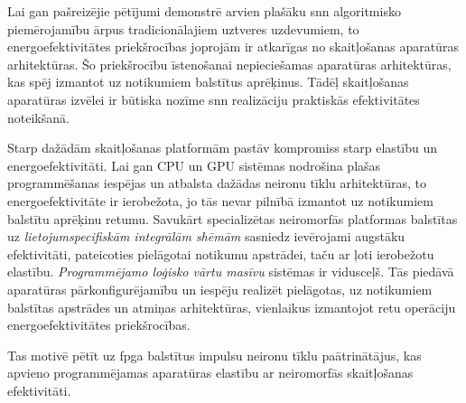 
Lai gan pašreizējie pētījumi demonstrē arvien plašāku \Gls{snn} algoritmisko piemērojamību ārpus tradicionālajiem uztveres
uzdevumiem, to energoefektivitātes priekšrocības joprojām ir atkarīgas no skaitļošanas aparatūras arhitektūras. Šo
priekšrocību īstenošanai nepieciešamas aparatūras arhitektūras, kas spēj izmantot uz notikumiem balstītus aprēķinus. Tādēļ
skaitļošanas aparatūras izvēlei ir būtiska nozīme \Gls{snn} realizāciju praktiskās efektivitātes noteikšanā.

Starp dažādām skaitļošanas platformām pastāv kompromiss starp elastību un energoefektivitāti. Lai gan CPU un GPU sistēmas
nodrošina plašas programmēšanas iespējas un atbalsta dažādas neironu tīklu arhitektūras, to energoefektivitāte ir ierobežota,
jo tās nevar pilnībā izmantot uz notikumiem balstītu aprēķinu retumu. Savukārt specializētas neiromorfās platformas balstītas
uz \textit{lietojumspecifiskām integrālām shēmām}  sasniedz ievērojami augstāku efektivitāti, pateicoties
pielāgotai notikumu apstrādei, taču ar ļoti ierobežotu elastību. \textit{Programmējamo loģisko vārtu masīvu} 
sistēmas ir vidusceļš. Tās piedāvā aparatūras pārkonfigurējamību un iespēju realizēt pielāgotas, uz notikumiem balstītas
apstrādes un atmiņas arhitektūras, vienlaikus izmantojot retu operāciju energoefektivitātes priekšrocības.

Tas motivē pētīt uz \Gls{fpga} balstītus impulsu neironu tīklu paātrinātājus, kas apvieno programmējamas aparatūras elastību
ar neiromorfās skaitļošanas efektivitāti.

